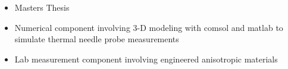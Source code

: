 \small
\begin{itemize}
    \item Masters Thesis
    \item Numerical component involving 3-D modeling with comsol and matlab to simulate thermal needle probe measurements
    \item Lab measurement component involving engineered anisotropic materials
\end{itemize}
\normalsize
